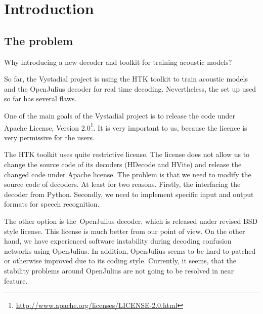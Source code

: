\chapter{Introduction}
\label{chap:intro}

% 
% 
% 



\section{The problem} 
\label{sec:why}
Why introducing a new decoder and toolkit for training acoustic models?

So far, the Vystadial project is using the HTK toolkit to train acoustic models and the OpenJulius decoder for real time decoding.
Nevertheless, the set up used so far has several flaws.

One of the main goals of the Vystadial project is to release the code under Apache License, Version 2.0\footnote{\url{http://www.apache.org/licenses/LICENSE-2.0.html}}. It is very important to us, because the licence is very permissive for the users. 

The HTK toolkit uses quite restrictive license. The license does not allow us to change the source code of its decoders (HDecode and HVite) and release the changed code under Apache license. The problem is that we need to modify the source code of decoders. At least for two reasons. Firstly, the interfacing the decoder from Python. Secondly, we need to implement specific input and output formats for speech recognition.

The other option is the~OpenJulius decoder, which is released under revised BSD style license. This license is much better from our point of view. On the other hand, we have experienced software instability during decoding confusion networks using OpenJulius. In addition, OpenJulius seems to be hard to patched or otherwise improved due to its coding style. Currently, it seems, that the stability problems around OpenJulius are not going to be resolved in near feature.

